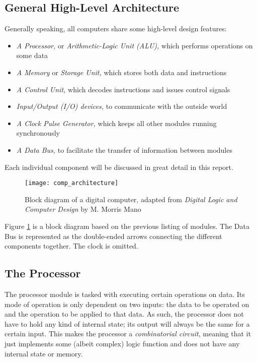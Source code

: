 \subsection{General High-Level Architecture}
Generally speaking, all computers share some high-level design features:
\begin{itemize}
  \item \emph{A Processor,} or \emph{Arithmetic-Logic Unit (ALU),} which performs operations on some data
  \item \emph{A Memory} or \emph{Storage Unit,} which stores both data and instructions
  \item \emph{A Control Unit,} which decodes instructions and issues control signals
  \item \emph{Input/Output (I/O) devices,} to communicate with the outside world
  \item \emph{A Clock Pulse Generator,} which keeps all other modules running synchronously
  \item \emph{A Data Bus,} to facilitate the transfer of information between modules
\end{itemize}
Each individual component will be discussed in great detail in this report.

\begin{figure}[H]
  \centering
  \texttt{[image: comp\_architecture]}
  \caption{Block diagram of a digital computer, adapted from \emph{Digital Logic and Computer Design} by M. Morris Mano \cite{mano2017digital}}
  \label{comp_architecture}
\end{figure}

Figure \ref{comp_architecture} is a block diagram based on the previous listing of modules. The Data Bus is represented as the double-ended arrows connecting the different components together. The clock is omitted.

\subsection{The Processor}
The processor module is tasked with executing certain operations on data. Its mode of operation is only dependent on two inputs: the data to be operated on and the operation to be applied to that data. As such, the processor does not have to hold any kind of internal state; its output will always be the same for a certain input. This makes the processor a \emph{combinatorial circuit}, meaning that it just implements some (albeit complex) logic function and does not have any internal state or memory.

